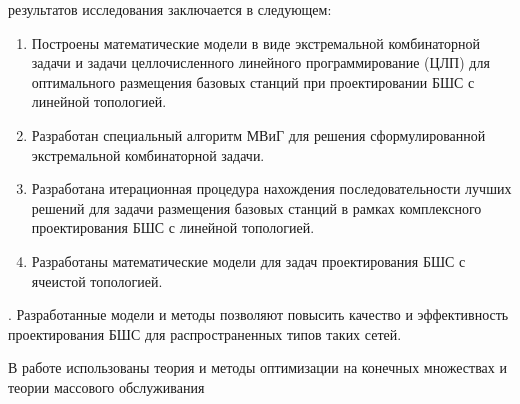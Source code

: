 {\novelty} результатов исследования заключается в следующем:
\begin{enumerate}[beginpenalty=10000] %
  \item Построены математические модели в виде экстремальной комбинаторной задачи и задачи целлочисленного линейного программирование (ЦЛП) для оптимального размещения базовых станций при проектировании БШС с линейной топологией.  
  \item Разработан специальный алгоритм МВиГ для решения сформулированной экстремальной комбинаторной задачи.
  \item Разработана итерационная процедура нахождения последовательности лучших решений для задачи размещения базовых станций в рамках комплексного проектирования БШС с линейной топологией.
  \item Разработаны математические модели для задач проектирования БШС с ячеистой топологией.
\end{enumerate}

{\influence}. Разработанные модели и методы позволяют повысить качество и эффективность проектирования БШС для распространенных типов таких сетей.


{\methods} В работе использованы теория и методы оптимизации на конечных множествах и теории массового обслуживания

{}


